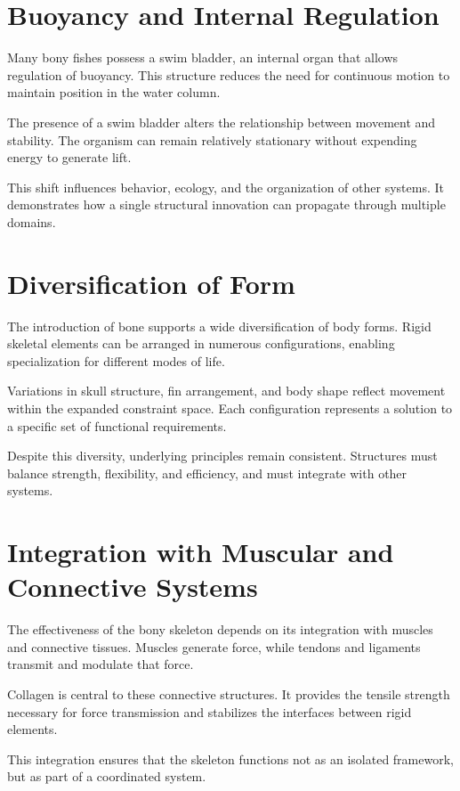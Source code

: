 \documentclass[11pt,oneside]{book}
\begin{document}
\section{Buoyancy and Internal Regulation}

Many bony fishes possess a swim bladder, an internal organ that allows regulation of buoyancy. This structure reduces the need for continuous motion to maintain position in the water column.

The presence of a swim bladder alters the relationship between movement and stability. The organism can remain relatively stationary without expending energy to generate lift.

This shift influences behavior, ecology, and the organization of other systems. It demonstrates how a single structural innovation can propagate through multiple domains.

\section{Diversification of Form}

The introduction of bone supports a wide diversification of body forms. Rigid skeletal elements can be arranged in numerous configurations, enabling specialization for different modes of life.

Variations in skull structure, fin arrangement, and body shape reflect movement within the expanded constraint space. Each configuration represents a solution to a specific set of functional requirements.

Despite this diversity, underlying principles remain consistent. Structures must balance strength, flexibility, and efficiency, and must integrate with other systems.

\section{Integration with Muscular and Connective Systems}

The effectiveness of the bony skeleton depends on its integration with muscles and connective tissues. Muscles generate force, while tendons and ligaments transmit and modulate that force.

Collagen is central to these connective structures. It provides the tensile strength necessary for force transmission and stabilizes the interfaces between rigid elements.

This integration ensures that the skeleton functions not as an isolated framework, but as part of a coordinated system.
\end{document}
